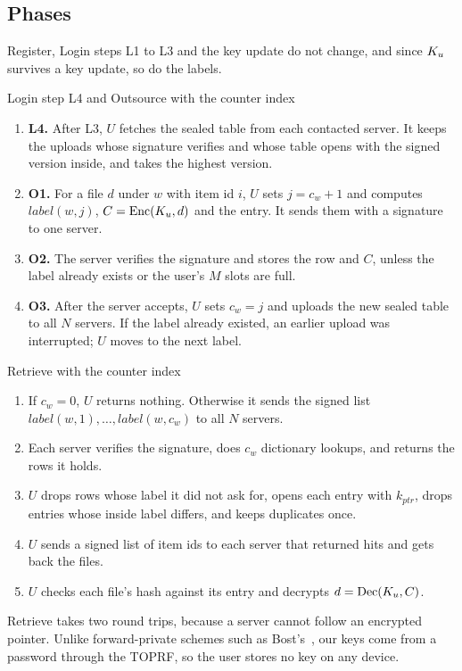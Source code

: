 \subsection{Phases}

Register, Login steps L1 to L3 and the key update do not change, and since $K_u$ survives a key update, so do the
labels.

\begin{protocol}{Login step L4 and Outsource with the counter index}
\begin{enumerate}[1.]
  \item \textbf{L4.} After L3, $U$ fetches the sealed table from each contacted server. It keeps the uploads whose
        signature verifies and whose table opens with the signed version inside, and takes the highest version.
  \item \textbf{O1.} For a file $d$ under $w$ with item id $i$, $U$ sets $j = c_w + 1$ and computes
        $\mathit{label}(w, j)$, $C = \mathrm{Enc}(K_u, d)$ and the entry. It sends them with a signature to one
        server.
  \item \textbf{O2.} The server verifies the signature and stores the row and $C$, unless the label already exists
        or the user's $M$ slots are full.
  \item \textbf{O3.} After the server accepts, $U$ sets $c_w = j$ and uploads the new sealed table to all $N$
        servers. If the label already existed, an earlier upload was interrupted; $U$ moves to the next label.
\end{enumerate}
\end{protocol}

\begin{protocol}{Retrieve with the counter index}
\begin{enumerate}[R1.]
  \item If $c_w = 0$, $U$ returns nothing. Otherwise it sends the signed list $\mathit{label}(w, 1), \dots,
        \mathit{label}(w, c_w)$ to all $N$ servers.
  \item Each server verifies the signature, does $c_w$ dictionary lookups, and returns the rows it holds.
  \item $U$ drops rows whose label it did not ask for, opens each entry with $k_{ptr}$, drops entries whose inside
        label differs, and keeps duplicates once.
  \item $U$ sends a signed list of item ids to each server that returned hits and gets back the files.
  \item $U$ checks each file's hash against its entry and decrypts $d = \mathrm{Dec}(K_u, C)$.
\end{enumerate}
\end{protocol}

Retrieve takes two round trips, because a server cannot follow an encrypted pointer. Unlike forward-private schemes
such as Bost's~\cite{bost2016sophos}, our keys come from a password through the TOPRF, so the user stores no key on
any device.
